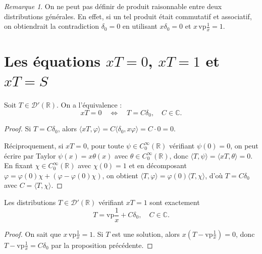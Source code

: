 \documentclass[12pt,a4paper,openany]{book}
\theoremstyle{definition}
\theoremstyle{plain}
\theoremstyle{remark}
\newtheorem*{remark}{Remarque}
\newenvironment{remarque}{\begin{remark}}{\end{remark}}
\begin{document}
	\begin{remarque}
		On ne peut pas définir de produit raisonnable entre deux distributions générales. En effet, si un tel produit était commutatif et associatif, on obtiendrait la contradiction $\delta_0 = 0$ en utilisant $x\delta_0 = 0$ et $x\,\mathrm{vp}\frac{1}{x}=1$.
	\end{remarque}
	
	\section{Les équations \texorpdfstring{$xT=0$}{xT=0}, \texorpdfstring{$xT=1$}{xT=1} et \texorpdfstring{$xT=S$}{xT=S}}
	
	\begin{proposition}
		Soit $T \in \mathcal{D}'(\mathbb{R})$. On a l'équivalence :
		\[
		xT = 0 \quad \Longleftrightarrow \quad T = C\delta_0, \quad C \in \mathbb{C}.
		\]
	\end{proposition}
	
	\begin{proof}
		Si $T = C\delta_0$, alors $\langle xT, \varphi \rangle = C\langle \delta_0, x\varphi \rangle = C \cdot 0 = 0$.
		
		Réciproquement, si $xT = 0$, pour toute $\psi \in C_0^\infty(\mathbb{R})$ vérifiant $\psi(0) = 0$, on peut écrire par Taylor $\psi(x) = x\theta(x)$ avec $\theta \in C_0^\infty(\mathbb{R})$, donc $\langle T, \psi \rangle = \langle xT, \theta \rangle = 0$. En fixant $\chi \in C_0^\infty(\mathbb{R})$ avec $\chi(0)=1$ et en décomposant $\varphi = \varphi(0)\chi + (\varphi - \varphi(0)\chi)$, on obtient $\langle T, \varphi \rangle = \varphi(0)\langle T, \chi \rangle$, d'où $T = C\delta_0$ avec $C = \langle T, \chi \rangle$.
	\end{proof}
	
	\begin{proposition}
		Les distributions $T \in \mathcal{D}'(\mathbb{R})$ vérifiant $xT = 1$ sont exactement
		\[
		T = \mathrm{vp}\frac{1}{x} + C\delta_0, \quad C \in \mathbb{C}.
		\]
	\end{proposition}
	
	\begin{proof}
		On sait que $x\,\mathrm{vp}\frac{1}{x} = 1$. Si $T$ est une solution, alors $x(T - \mathrm{vp}\frac{1}{x}) = 0$, donc $T - \mathrm{vp}\frac{1}{x} = C\delta_0$ par la proposition précédente.
	\end{proof}
	
\end{document}
